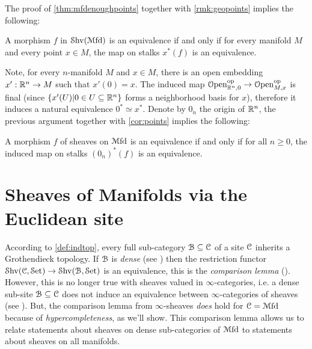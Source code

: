 \documentclass[10pt]{amsart}
\begin{document}
The proof of \cref{thm:mfdenoughpoints} together with \cref{rmk:geopoints} implies the following: 
\begin{corollary}\label{cor:points}
  A morphism $f$ in $\mathcal{S}\mathrm{hv}(\mathcal{M}\mathrm{fd})$ is an equivalence if and only if for every manifold $M$ and every point $x \in M$, the map on stalks $x^*(f)$ is an equivalence.
\end{corollary}
Note, for every $n$-manifold $M$ and $x\in M$, there is an open embedding $x':\mathbb{R}^n\to M$ such that $x'(0)=x$. The induced map $\mathcal{O}\mathrm{pen}_{\mathbb{R}^n,0}^{\mathrm{op}}\to\mathcal{O}\mathrm{pen}_{M,x}^{\mathrm{op}}$ is final (since $\{x'(U)|0\in U\subseteq\mathbb{R}^n\}$ forms a neighborhood basis for $x$), therefore it induces a natural equivalence $0^*\simeq x^*$. Denote by $0_n$ the origin of $\mathbb{R}^n$, the previous argument together with \cref{cor:points} implies the following:
\begin{corollary}
  A morphism $f$ of sheaves on $\mathcal{M}\mathrm{fd}$ is an equivalence if and only if for all $n \geq 0$, the induced map on stalks $(0_n)^*(f) $ is an equivalence.
\end{corollary}

\section{Sheaves of Manifolds via the Euclidean site}

According to \cref{def:indtop}, every full sub-category $\mathcal{B}\subseteq\mathcal{C}$ of a site $\mathcal{C}$ inherits a Grothendieck topology. If $\mathcal{B}$ is \emph{dense} (see \cite[Definition 2.2.1]{johnstone2002elephanti}) then the restriction functor $\mathcal{S}\mathrm{hv}(\mathcal{C},\mathcal{S}\mathrm{et})\to\mathcal{S}\mathrm{hv}(\mathcal{B},\mathcal{S}\mathrm{et})$ is an equivalence, this is the \emph{comparison lemma} (\cite[Theorem 2.2.3]{johnstone2002elephanti}). However, this is no longer true with sheaves valued in $\infty$-categories, i.e. a dense sub-site $\mathcal{B}\subseteq\mathcal{C}$ does not induce an equivalence between $\infty$-categories of sheaves (see \cite[Counterexample 20.4.0.1]{lurie2018sag}). But, the comparison lemma from $\infty$-sheaves \emph{does} hold for $\mathcal{C}=\mathcal{M}\mathrm{fd}$ because of \emph{hypercompleteness}, as we'll show. This comparison lemma allows us to relate statements about sheaves on dense sub-categories of $\mathcal{M}\mathrm{fd}$ to statements about sheaves on all manifolds.
\end{document}
